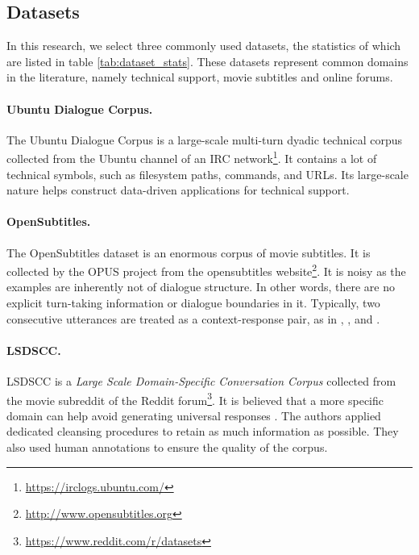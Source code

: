 \documentclass[runningheads]{llncs}
\begin{document}
    \subsection{Datasets}
    In this research, we select three commonly used datasets, the statistics of which are listed in table \ref{tab:dataset_stats}. These datasets represent common domains in the literature, namely technical support, movie subtitles and online forums.
    

    \paragraph{Ubuntu Dialogue Corpus.}
    The Ubuntu Dialogue Corpus \cite{ubuntu_corpus} is a large-scale multi-turn dyadic technical corpus collected from the Ubuntu channel of an IRC network\footnote{\url{https://irclogs.ubuntu.com/}}. It contains a lot of technical symbols, such as filesystem paths, commands, and URLs. Its large-scale nature helps construct data-driven applications for technical support.

    \paragraph{OpenSubtitles.}
    The OpenSubtitles dataset \cite{opensub} is an enormous corpus of movie subtitles. It is collected by the OPUS project \cite{OPUS} from the opensubtitles website\footnote{\url{http://www.opensubtitles.org}}. It is noisy as the examples are inherently not of dialogue structure. In other words, there are no explicit turn-taking information or dialogue boundaries in it. Typically, two consecutive utterances are treated as a context-response pair, as in \cite{GoogleChatbot}, \cite{MMI}, and \cite{persona}.

    \paragraph{LSDSCC.}
    LSDSCC \cite{LSDSCC} is a \emph{Large Scale Domain-Specific Conversation Corpus} collected from the movie subreddit of the Reddit forum\footnote{\url{https://www.reddit.com/r/datasets}}. It is believed that a more specific domain can help avoid generating universal responses \cite{LSDSCC}. The authors applied dedicated cleansing procedures to retain as much information as possible. They also used human annotations to ensure the quality of the corpus.
\end{document}
